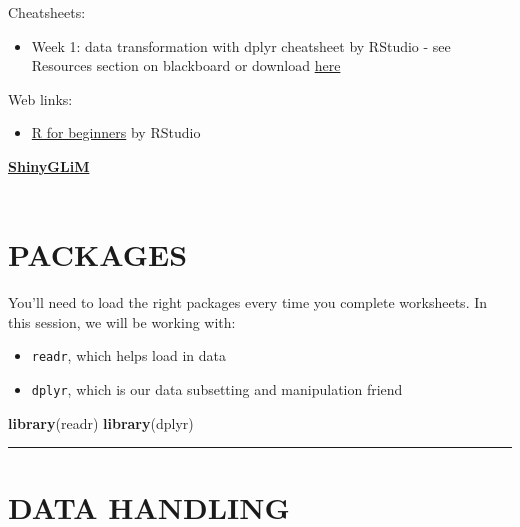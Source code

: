 \documentclass[
]{book}
\newenvironment{Shaded}{\begin{snugshade}}{\end{snugshade}}
\newcommand{\KeywordTok}[1]{\textcolor[rgb]{0.13,0.29,0.53}{\textbf{#1}}}
\newcommand{\NormalTok}[1]{#1}
\providecommand{\tightlist}{%
  \setlength{\itemsep}{0pt}\setlength{\parskip}{0pt}}
\begin{document}
Cheatsheets:

\begin{itemize}
\tightlist
\item
  Week 1: data transformation with dplyr cheatsheet by RStudio -
  see Resources section on blackboard or download
  \href{https://github.com/rstudio/cheatsheets/raw/master/data-transformation.pdf}{here}
\end{itemize}

Web links:

\begin{itemize}
\tightlist
\item
  \href{https://education.rstudio.com/learn/beginner\%22}{R for beginners} by RStudio
  ~
\end{itemize}

\href{https://iainmstott.shinyapps.io/ShinyGLiM}{\textbf{ShinyGLiM}}\\
~\\

\hypertarget{packages}{%
\section{PACKAGES}\label{packages}}

You'll need to load the right packages every time you complete worksheets. In
this session, we will be working with:

\begin{itemize}
\tightlist
\item
  \texttt{readr}, which helps load in data
\item
  \texttt{dplyr}, which is our data subsetting and manipulation friend
\end{itemize}

\begin{Shaded}
\begin{Highlighting}[]
\KeywordTok{library}\NormalTok{(readr)}
\KeywordTok{library}\NormalTok{(dplyr)}
\end{Highlighting}
\end{Shaded}

\begin{center}\rule{0.5\linewidth}{0.5pt}\end{center}

\hypertarget{data-handling}{%
\section{DATA HANDLING}\label{data-handling}}
\end{document}
